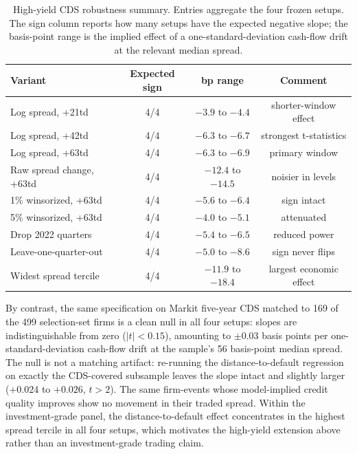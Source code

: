 \documentclass[pdflatex,sn-mathphys-num]{sn-jnl}%
\theoremstyle{thmstyleone}%
\theoremstyle{thmstyletwo}%
\theoremstyle{thmstylethree}%
\begin{document}
\begin{table}[!htbp]
\centering
\caption{High-yield CDS robustness summary. Entries aggregate the four frozen setups. The sign column reports how many setups have the expected negative slope; the basis-point range is the implied effect of a one-standard-deviation cash-flow drift at the relevant median spread.}
\label{Tab:HY_CDS_Robust}
\begin{tabular}{lccc}
\toprule
Variant & Expected sign & bp range & Comment \\
\midrule
Log spread, +21td & 4/4 & $-3.9$ to $-4.4$ & shorter-window effect \\
Log spread, +42td & 4/4 & $-6.3$ to $-6.7$ & strongest t-statistics \\
Log spread, +63td & 4/4 & $-6.3$ to $-6.9$ & primary window \\
Raw spread change, +63td & 4/4 & $-12.4$ to $-14.5$ & noisier in levels \\
1\% winsorized, +63td & 4/4 & $-5.6$ to $-6.4$ & sign intact \\
5\% winsorized, +63td & 4/4 & $-4.0$ to $-5.1$ & attenuated \\
Drop 2022 quarters & 4/4 & $-5.4$ to $-6.5$ & reduced power \\
Leave-one-quarter-out & 4/4 & $-5.0$ to $-8.6$ & sign never flips \\
Widest spread tercile & 4/4 & $-11.9$ to $-18.4$ & largest economic effect \\
\bottomrule
\end{tabular}
\end{table}

By contrast, the same specification on Markit five-year CDS matched to 169 of the 499 selection-set firms is a clean null in all four setups: slopes are indistinguishable from zero ($|t| < 0.15$), amounting to $\pm 0.03$ basis points per one-standard-deviation cash-flow drift at the sample's 56 basis-point median spread. The null is not a matching artifact: re-running the distance-to-default regression on exactly the CDS-covered subsample leaves the slope intact and slightly larger ($+0.024$ to $+0.026$, $t > 2$). The same firm-events whose model-implied credit quality improves show no movement in their traded spread. Within the investment-grade panel, the distance-to-default effect concentrates in the highest spread tercile in all four setups, which motivates the high-yield extension above rather than an investment-grade trading claim.
\end{document}
